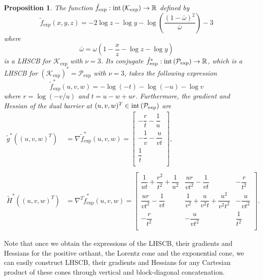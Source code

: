 \documentclass[10pt]{article}
\theoremstyle{definition}
\theoremstyle{plain}
\newtheorem{prop}{Proposition}
\def\interior{\protect{\textnormal{int}}}
\begin{document}
\begin{prop}
	The function $\tilde{f}_{\exp}: \textnormal{int}\left(\mathcal{K}_{\exp}\right)\rightarrow \mathbb{R}$ defined by
	\[\tilde{f}_{\exp}(x,y,z) = -2 \log z - \log y  - \log \left(\dfrac{(1-\bar{\omega})^2}{\bar{\omega}}\right) - 3 \]
	where 
	\[\bar{\omega} = \omega\left(1-\dfrac{x}{z} - \log z - \log y\right) \]
	is a LHSCB for $\mathcal{K}_{\exp}$ with $\nu = 3$. Its conjugate $\tilde{f}_{\exp}^*: \textnormal{int}\left(\mathcal{P}_{\exp}\right) \rightarrow \mathbb{R}$, which is a LHSCB for $\left(\mathcal{K}_{\exp}\right)^* = \mathcal{P}_{\exp}$ with $\nu=3$, takes the following expression 
	\[\tilde{f}_{\exp}^*(u,v,w) = -\log\left(-t\right) - \log (-u) - \log v\]
	where $r = \log \left(-v/u\right)$ and $t=u-w+ur$.  Furthermore, the gradient and Hessian of the dual barrier at $(u,v,w)^T \in \interior\left(\mathcal{P}_{\exp}\right)$ are \\
	\begin{align*}
	\tilde{g}^*\left((u,v,w)^T\right) &= \nabla \tilde{f}^*_{\exp}(u,v,w) =  
	\begin{bmatrix}
	-\dfrac{r}{t} - \dfrac{1}{u} \\[2ex]
	-\dfrac{1}{v} - \dfrac{u}{vt} \\[2ex]
	\dfrac{1}{t} \\[1ex]
	\end{bmatrix}, \\ \\
	\tilde{H}^*\left((u,v,w)^T\right) &= \nabla^2 \tilde{f}^*_{\exp}(u,v,w) =  
	\begin{bmatrix}
	\dfrac{1}{ut} + \dfrac{r^2}{t^2}+ \dfrac{1}{u^2} & \dfrac{ur}{vt^2} - \dfrac{1}{vt} & -\dfrac{r}{t^2} \\[2ex]
	\dfrac{ur}{vt^2} - \dfrac{1}{vt}  & \dfrac{1}{v^2}+\dfrac{u}{v^2t} + \dfrac{u^2}{v^2t^2} & -\dfrac{u}{vt^2} \\[2ex]
	-\dfrac{r}{t^2}	& -\dfrac{u}{vt^2} & \dfrac{1}{t^2} \\[1.5ex]
	\end{bmatrix}.
	\end{align*}
\end{prop}
Note that once we obtain the expressions of the LHSCB, their gradients and Hessians for the positive orthant, the Lorentz cone and the exponential cone, we can easily construct LHSCB, their gradients and Hessians for any Cartesian product of these cones through vertical and block-diagonal concatenation.
\end{document}
